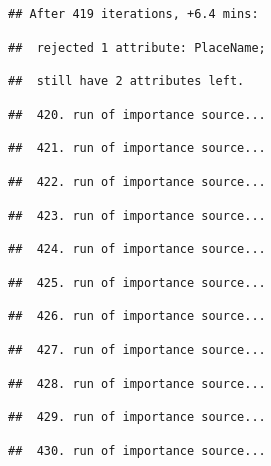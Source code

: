 \documentclass[
]{article}
\begin{document}
\begin{verbatim}
## After 419 iterations, +6.4 mins:
\end{verbatim}

\begin{verbatim}
##  rejected 1 attribute: PlaceName;
\end{verbatim}

\begin{verbatim}
##  still have 2 attributes left.
\end{verbatim}

\begin{verbatim}
##  420. run of importance source...
\end{verbatim}

\begin{verbatim}
##  421. run of importance source...
\end{verbatim}

\begin{verbatim}
##  422. run of importance source...
\end{verbatim}

\begin{verbatim}
##  423. run of importance source...
\end{verbatim}

\begin{verbatim}
##  424. run of importance source...
\end{verbatim}

\begin{verbatim}
##  425. run of importance source...
\end{verbatim}

\begin{verbatim}
##  426. run of importance source...
\end{verbatim}

\begin{verbatim}
##  427. run of importance source...
\end{verbatim}

\begin{verbatim}
##  428. run of importance source...
\end{verbatim}

\begin{verbatim}
##  429. run of importance source...
\end{verbatim}

\begin{verbatim}
##  430. run of importance source...
\end{verbatim}
\end{document}
